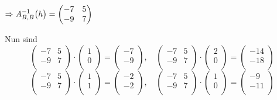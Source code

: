 \documentclass{scrreprt}
\begin{document}
\begin{enumerate}[(a)]
  $\Rightarrow A_{B, B}^{-1}\qty\big(h) = \begin{pmatrix}
    -7 & 5 \\
    -9 & 7  \\
  \end{pmatrix}$

  Nun sind
  \[
    \begin{pmatrix}
      -7 & 5 \\
      -9 & 7  \\
    \end{pmatrix} \cdot \begin{pmatrix}
      1 \\
      0 \\
    \end{pmatrix} = \begin{pmatrix}
      -7 \\
      -9 \\
    \end{pmatrix}, \quad
    \begin{pmatrix}
      -7 & 5 \\
      -9 & 7  \\
    \end{pmatrix} \cdot \begin{pmatrix}
      2 \\
      0 \\
    \end{pmatrix} = \begin{pmatrix}
      -14 \\
      -18 \\
    \end{pmatrix}
  \]
  \[
    \begin{pmatrix}
      -7 & 5 \\
      -9 & 7  \\
    \end{pmatrix} \cdot \begin{pmatrix}
      1 \\
      1 \\
    \end{pmatrix} = \begin{pmatrix}
      -2 \\
      -2 \\
    \end{pmatrix}, \quad
    \begin{pmatrix}
      -7 & 5 \\
      -9 & 7  \\
    \end{pmatrix} \cdot \begin{pmatrix}
      1 \\
      0 \\
    \end{pmatrix} = \begin{pmatrix}
      -9  \\
      -11 \\
    \end{pmatrix}
  \]


\end{enumerate}
\end{document}
